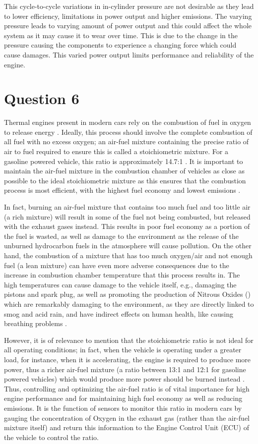 \documentclass[11pt]{article}
\begin{document}
This cycle-to-cycle variations in in-cylinder pressure are not desirable as they lead to lower efficiency, limitations in power output and higher emissions. The varying pressure leads to varying amount of power output and this could affect the whole system as it may cause it to wear over time. This is due to the change in the pressure causing the components to experience a changing force which could cause damages. This varied power output limits performance and reliability of the engine.  
\section{Question 6}
Thermal engines present in modern cars rely on the combustion of fuel in oxygen to release energy \cite{q6-r1}. Ideally, this process should involve the complete combustion of all fuel with no excess oxygen; an air-fuel mixture containing the precise ratio of air to fuel required to ensure this is called a stoichiometric mixture. For a gasoline powered vehicle, this ratio is approximately 14.7:1 \cite{q6-r1}. It is important to maintain the air-fuel mixture in the combustion chamber of vehicles as close as possible to the ideal stoichiometric mixture as this ensures that the combustion process is most efficient, with the highest fuel economy and lowest emissions \cite{q6-r2}.

In fact, burning an air-fuel mixture that contains too much fuel and too little air (a rich mixture) will result in some of the fuel not being combusted, but released with the exhaust gases instead. This results in poor fuel economy as a portion of the fuel is wasted, as well as damage to the environment as the release of the unburned hydrocarbon fuels in the atmosphere will cause pollution. On the other hand, the combustion of a mixture that has too much oxygen/air and not enough fuel (a lean mixture) can have even more adverse consequences due to the increase in combustion chamber temperature that this process results in. The high temperatures can cause damage to the vehicle itself, e.g., damaging the pistons and spark plug, as well as promoting the production of Nitrous Oxides ()  which are remarkably damaging to the environment, as they are directly linked to smog and acid rain, and have indirect effects on human health, like causing breathing problems \cite{q6-r2} \cite{q6-r3} \cite{q6-r4}.

However, it is of relevance to mention that the stoichiometric ratio is not ideal for all operating conditions; in fact, when the vehicle is operating under a greater load, for instance, when it is accelerating, the engine is required to produce more power, thus a richer air-fuel mixture (a ratio between 13:1 and 12:1 for gasoline powered vehicles) which would produce more power should be burned instead \cite{q6-r4}. Thus, controlling and optimizing the air-fuel ratio is of vital importance for high engine performance and for maintaining high fuel economy as well as reducing emissions. It is the function of  sensors to monitor this ratio in modern cars by gauging the concentration of Oxygen in the exhaust gas (rather than the air-fuel mixture itself) and return this information to the Engine Control Unit (ECU) of the vehicle to control the ratio. 
\end{document}

